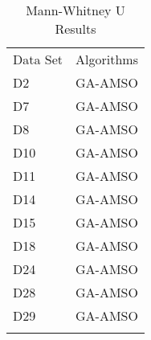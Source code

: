 \begin{table}
\caption{Mann-Whitney U Results}
\label{tbl:mann:whitney:u}
\begin{tabular}{ll}
\noalign{\smallskip}\hline\noalign{\smallskip}
Data Set & Algorithms \\
\noalign{\smallskip}\hline
D2&GA-AMSO\\
D7&GA-AMSO\\
D8&GA-AMSO\\
D10&GA-AMSO\\
D11&GA-AMSO\\
D14&GA-AMSO\\
D15&GA-AMSO\\
D18&GA-AMSO\\
D24&GA-AMSO\\
D28&GA-AMSO\\
D29&GA-AMSO\\
\noalign{\smallskip}\hline
\end{tabular}
\end{table}
